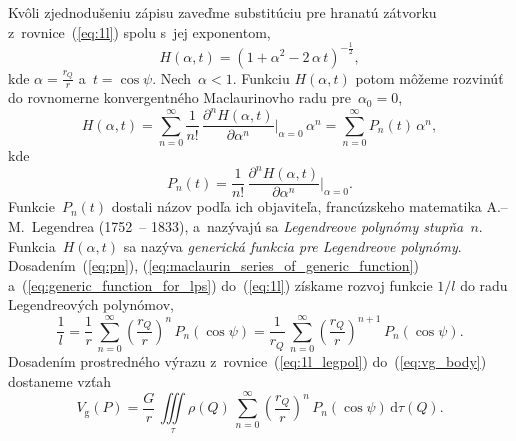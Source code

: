 \documentclass[a4paper,12pt]{book}
\newcommand{\diff}{\mathrm d}
\newcommand{\gidx}{\mathrm g}
\begin{document}
Kvôli zjednodušeniu zápisu zaveďme substitúciu pre hranatú zátvorku
z~rovnice~(\ref{eq:1l}) spolu s~jej exponentom,
%
\begin{equation}
\label{eq:generic_function_for_lps}
H(\alpha, t) = \left(1 + \alpha^2 - 2 \, \alpha\, t \right)^{-\frac{1}{2}}{,}
\end{equation}
%
kde $\alpha = \frac{r_Q}{r}$ a~$t = \cos\psi$.  Nech~$\alpha < 1$.  Funkciu
$H(\alpha, t)$ potom môžeme rozvinúť do rovnomerne konvergentného Maclaurinovho
radu pre~$\alpha_0 = 0$,
%
\begin{equation}
\label{eq:maclaurin_series_of_generic_function}
H(\alpha, t) = \sum_{n = 0}^\infty \frac{1}{n!} \, \frac{\partial^n H(\alpha,
t)}{\partial \alpha^n} \bigg\lvert_{\alpha = 0} \, \alpha^n = \sum_{n 
= 0}^\infty P_n(t) \, \alpha^n{,}
\end{equation}
%
kde
%
\begin{equation}
\label{eq:pn}
P_n(t) = \frac{1}{n!} \, \frac{\partial^n H(\alpha, t)}{\partial \alpha^n} 
\bigg\lvert_{\alpha = 0}{.}
\end{equation}
%
Funkcie~$P_n(t)$ dostali názov podľa ich objaviteľa, francúzskeho matematika
A.--M.~Legendrea (1752~-- 1833), a~nazývajú sa \emph{Legendreove polynómy
stupňa~$n$}.  Funkcia~$H(\alpha, t)$ sa nazýva \emph{generická funkcia pre
Legendreove polynómy}.  Dosadením~(\ref{eq:pn}),
(\ref{eq:maclaurin_series_of_generic_function}) 
a~(\ref{eq:generic_function_for_lps}) do~(\ref{eq:1l}) získame rozvoj funkcie 
$1 \slash l$ do radu Legendreových polynómov,
%
\begin{equation}
\label{eq:1l_legpol}
\frac{1}{l} = \frac{1}{r} \, \sum_{n = 0}^\infty \left( \frac{r_Q}{r} 
\right)^{n} \, P_n(\cos\psi) = \frac{1}{r_Q} \, \sum_{n = 0}^\infty \left( 
\frac{r_Q}{r} \right)^{n + 1} \, P_n(\cos\psi){.}
\end{equation}
%
Dosadením prostredného výrazu z~rovnice~(\ref{eq:1l_legpol}) 
do~(\ref{eq:vg_body})
dostaneme vzťah
%
\begin{equation}
\label{eq:vg_legpol}
V_\gidx(P) = \frac{G}{r} \, \iiint\limits_{\tau} \rho(Q) \, \sum_{n 
= 0}^{\infty} \left( \frac{r_Q}{r} \right)^n \, P_n(\cos\psi) \, 
\diff\tau(Q){.}
\end{equation}
\end{document}

